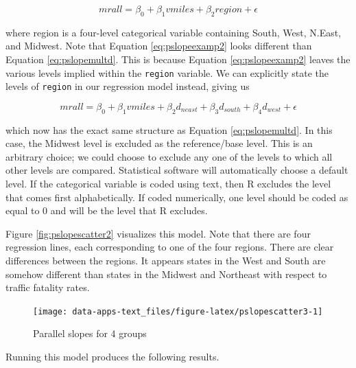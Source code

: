 \documentclass[
]{book}
\begin{document}
\begin{equation}
mrall = \beta_0 + \beta_1vmiles + \beta_2region + \epsilon
\label{eq:pslopeexamp2}
\end{equation}

where region is a four-level categorical variable containing South, West, N.East, and Midwest. Note that Equation \eqref{eq:pslopeexamp2} looks different than Equation \eqref{eq:pslopemultd}. This is because Equation \eqref{eq:pslopeexamp2} leaves the various levels implied within the \texttt{region} variable. We can explicitly state the levels of \texttt{region} in our regression model instead, giving us

\begin{equation}
mrall = \beta_0 + \beta_1vmiles + \beta_2d_{neast} + \beta_3d_{south} + \beta_4d_{west} + \epsilon
\label{eq:pslopeexamp3}
\end{equation}

which now has the exact same structure as Equation \eqref{eq:pslopemultd}. In this case, the Midwest level is excluded as the reference/base level. This is an arbitrary choice; we could choose to exclude any one of the levels to which all other levels are compared. Statistical software will automatically choose a default level. If the categorical variable is coded using text, then R excludes the level that comes first alphabetically. If coded numerically, one level should be coded as equal to 0 and will be the level that R excludes.

Figure \ref{fig:pslopescatter2} visualizes this model. Note that there are four regression lines, each corresponding to one of the four regions. There are clear differences between the regions. It appears states in the West and South are somehow different than states in the Midwest and Northeast with respect to traffic fatality rates.

\begin{figure}

{\centering \texttt{[image: data-apps-text\_files/figure-latex/pslopescatter3-1]} 

}

\caption{Parallel slopes for 4 groups}\label{fig:pslopescatter3}
\end{figure}

Running this model produces the following results.
\end{document}
